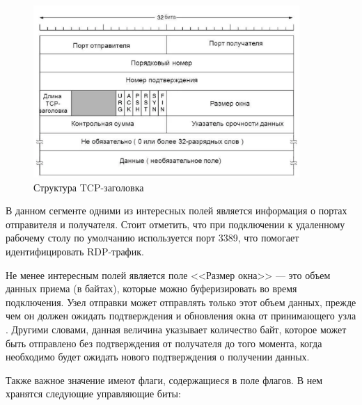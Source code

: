 \documentclass[bachelor, och, coursework]{SCWorks}
\begin{document}
  \begin{figure}[H]
    \centering
    \includegraphics[width=0.9\textwidth]{pics/tcp-segment.png}
    \caption{Структура TCP-заголовка}
    \label{tcp-header}
  \end{figure}

В данном сегменте одними из интересных полей является информация о портах отправителя и получателя. Стоит отметить, что при подключении к 
удаленному рабочему столу по умолчанию используется порт 3389, что помогает идентифицировать RDP-трафик.

Не менее интересным полей является поле <<Размер окна>> --- это объем данных приема (в байтах), которые можно буферизировать во время подключения. 
Узел отправки может отправлять только этот объем данных, прежде чем он должен ожидать подтверждения и обновления окна от принимающего узла \cite{winsize}.
Другими словами, данная величина указывает количество байт, которое может быть отправлено без подтверждения от получателя до того момента, когда 
необходимо будет ожидать нового подтверждения о получении данных.

Также важное значение имеют флаги, содержащиеся в поле флагов. В нем хранятся следующие управляющие биты:
\end{document}

